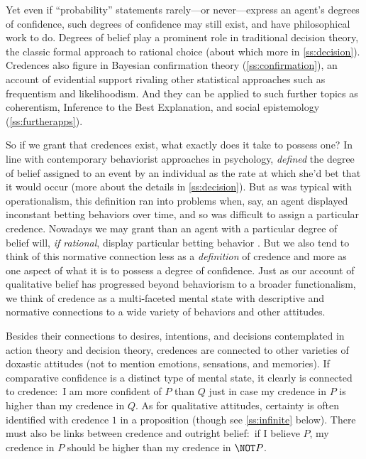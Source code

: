 Yet even if ``probability'' statements rarely---or never---express an agent's degrees of confidence, such degrees of confidence may still exist, and have philosophical work to do. Degrees of belief play a prominent role in traditional decision theory, the classic formal approach to rational choice (about which more in \autoref{ss:decision}). Credences also figure in Bayesian confirmation theory (\autoref{ss:confirmation}), an account of evidential support rivaling other statistical approaches such as frequentism and likelihoodism. And they can be applied to such further topics as coherentism, Inference to the Best Explanation, and social epistemology (\autoref{ss:furtherapps}).

So if we grant that credences exist, what exactly does it take to possess one? In line with contemporary behaviorist approaches in psychology, \citet{deFinettiForesight} \emph{defined} the degree of belief assigned to an event by an individual as the rate at which she'd bet that it would occur (more about the details in \autoref{ss:decision}). But as was typical with operationalism, this definition ran into problems when, say, an agent displayed inconstant betting behaviors over time, and so was difficult to assign a particular credence. Nowadays we may grant than an agent with a particular degree of belief will, \emph{if rational}, display particular betting behavior \citep{ChristensenPlace}. But we also tend to think of this normative connection less as a \emph{definition} of credence and more as one aspect of what it is to possess a degree of confidence. Just as our account of qualitative belief has progressed beyond behaviorism to a broader functionalism, we think of credence as a multi-faceted mental state with descriptive and normative connections to a wide variety of behaviors and other attitudes.

Besides their connections to desires, intentions, and decisions contemplated in action theory and decision theory, credences are connected to other varieties of doxastic attitudes (not to mention emotions, sensations, and memories). If comparative confidence is a distinct type of mental state, it clearly is connected to credence:\ I am more confident of $P$ than $Q$ just in case my credence in $P$ is higher than my credence in $Q$. As for qualitative attitudes, certainty is often identified with credence $1$ in a proposition (though see \autoref{ss:infinite} below). There must also be links between credence and outright belief:\ if I believe $P$, my credence in $P$ should be higher than my credence in $\NOT P$. 

